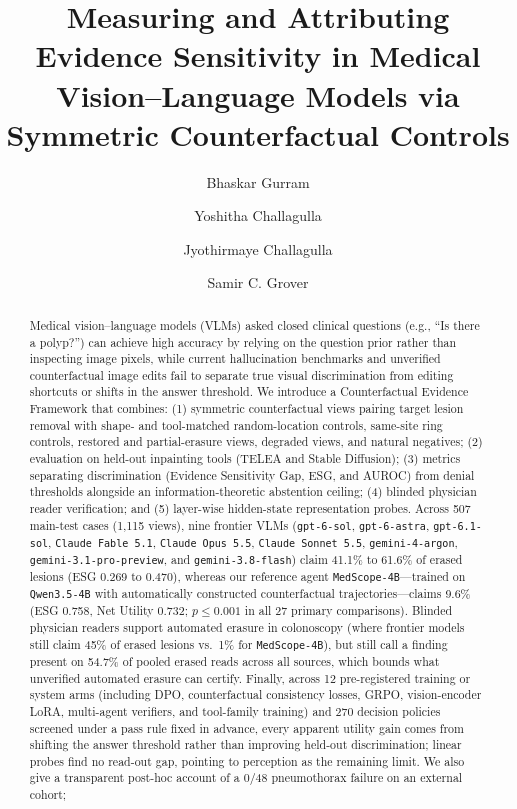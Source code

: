 \documentclass[5p,times,twocolumn,authoryear]{elsarticle}
\newcommand{\toconfirm}[1]{\textcolor{red}{\textbf{[To confirm: #1]}}}
\begin{document}
\begin{frontmatter}
\title{Measuring and Attributing Evidence Sensitivity in Medical Vision--Language Models via Symmetric Counterfactual Controls}

\author[ind]{Bhaskar Gurram}
\author[ind]{Yoshitha Challagulla}
\author[jc]{Jyothirmaye Challagulla}
\author[shn,uoft]{Samir C. Grover}
\address[ind]{Independent Researcher}
\address[jc]{\toconfirm{affiliation of Jyothirmaye Challagulla (internal medicine)}}
\address[shn]{Scarborough Health Network Research Institute, Toronto, Ontario, Canada}
\address[uoft]{Department of Medicine, University of Toronto, Toronto, Ontario, Canada}

\begin{abstract}
Medical vision--language models (VLMs) asked closed clinical questions (e.g., ``Is there a polyp?'') can achieve high accuracy by relying on the question prior rather than inspecting image pixels, while current hallucination benchmarks and unverified counterfactual image edits fail to separate true visual discrimination from editing shortcuts or shifts in the answer threshold. We introduce a Counterfactual Evidence Framework that combines: (1) symmetric counterfactual views pairing target lesion removal with shape- and tool-matched random-location controls, same-site ring controls, restored and partial-erasure views, degraded views, and natural negatives; (2) evaluation on held-out inpainting tools (TELEA and Stable Diffusion); (3) metrics separating discrimination (Evidence Sensitivity Gap, ESG, and AUROC) from denial thresholds alongside an information-theoretic abstention ceiling; (4) blinded physician reader verification; and (5) layer-wise hidden-state representation probes. Across 507 main-test cases (1,115 views), nine frontier VLMs (\texttt{gpt-6-sol}, \texttt{gpt-6-astra}, \texttt{gpt-6.1-sol}, \texttt{Claude Fable 5.1}, \texttt{Claude Opus 5.5}, \texttt{Claude Sonnet 5.5}, \texttt{gemini-4-argon}, \texttt{gemini-3.1-pro-preview}, and \texttt{gemini-3.8-flash}) claim 41.1\% to 61.6\% of erased lesions (ESG 0.269 to 0.470), whereas our reference agent \texttt{MedScope-4B}---trained on \texttt{Qwen3.5-4B} with automatically constructed counterfactual trajectories---claims 9.6\% (ESG 0.758, Net Utility 0.732; $p \le 0.001$ in all 27 primary comparisons). Blinded physician readers support automated erasure in colonoscopy (where frontier models still claim 45\% of erased lesions vs.\ 1\% for \texttt{MedScope-4B}), but still call a finding present on 54.7\% of pooled erased reads across all sources, which bounds what unverified automated erasure can certify. Finally, across 12 pre-registered training or system arms (including DPO, counterfactual consistency losses, GRPO, vision-encoder LoRA, multi-agent verifiers, and tool-family training) and 270 decision policies screened under a pass rule fixed in advance, every apparent utility gain comes from shifting the answer threshold rather than improving held-out discrimination; linear probes find no read-out gap, pointing to perception as the remaining limit. We also give a transparent post-hoc account of a 0/48 pneumothorax failure on an external cohort; 
\end{abstract}
\end{frontmatter}
\end{document}
